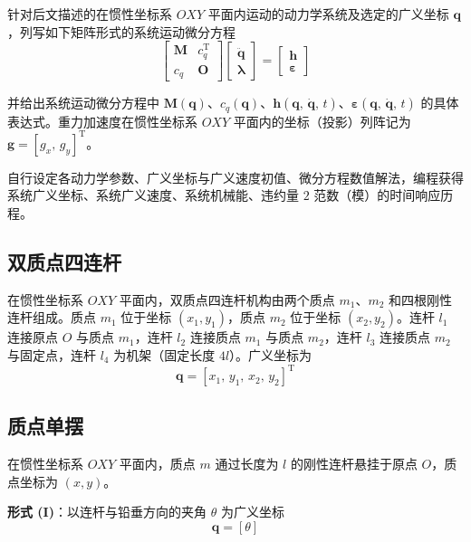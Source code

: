 针对后文描述的在惯性坐标系 $OXY$ 平面内运动的动力学系统及选定的广义坐标 $\boldsymbol{q}$，列写如下矩阵形式的系统运动微分方程
\begin{equation*}
\begin{bmatrix} \boldsymbol{M} & c_q^{\mathrm{T}} \\[4pt] c_q & \boldsymbol{O} \end{bmatrix} \begin{bmatrix} \ddot{\boldsymbol{q}} \\[4pt] \boldsymbol{\lambda} \end{bmatrix} = \begin{bmatrix} \boldsymbol{h} \\[4pt] \boldsymbol{\varepsilon} \end{bmatrix}
\end{equation*}

并给出系统运动微分方程中 $\boldsymbol{M}(\boldsymbol{q})$、$c_q(\boldsymbol{q})$、$\boldsymbol{h}(\boldsymbol{q},\, \dot{\boldsymbol{q}},\, t)$、$\boldsymbol{\varepsilon}(\boldsymbol{q},\, \dot{\boldsymbol{q}},\, t)$ 的具体表达式。重力加速度在惯性坐标系 $OXY$ 平面内的坐标（投影）列阵记为 $\boldsymbol{g} = [g_x,\, g_y]^{\mathrm{T}}$。

自行设定各动力学参数、广义坐标与广义速度初值、微分方程数值解法，编程获得系统广义坐标、系统广义速度、系统机械能、违约量 $2$ 范数（模）的时间响应历程。

\subsection*{双质点四连杆}

在惯性坐标系 $OXY$ 平面内，双质点四连杆机构由两个质点 $m_1$、$m_2$ 和四根刚性连杆组成。质点 $m_1$ 位于坐标 $(x_1, y_1)$，质点 $m_2$ 位于坐标 $(x_2, y_2)$。连杆 $l_1$ 连接原点 $O$ 与质点 $m_1$，连杆 $l_2$ 连接质点 $m_1$ 与质点 $m_2$，连杆 $l_3$ 连接质点 $m_2$ 与固定点，连杆 $l_4$ 为机架（固定长度 $4l$）。广义坐标为
\begin{equation*}
\boldsymbol{q} = [x_1,\, y_1,\, x_2,\, y_2]^{\mathrm{T}} \tag{II}
\end{equation*}

\subsection*{质点单摆}

在惯性坐标系 $OXY$ 平面内，质点 $m$ 通过长度为 $l$ 的刚性连杆悬挂于原点 $O$，质点坐标为 $(x, y)$。

\textbf{形式 (I)}：以连杆与铅垂方向的夹角 $\theta$ 为广义坐标
\begin{equation*}
\boldsymbol{q} = [\theta] \tag{I}
\end{equation*}

